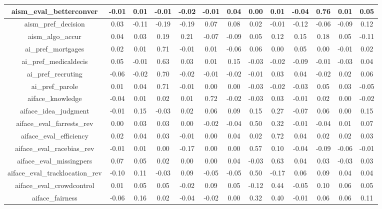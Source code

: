 {\begin{tabular}{c | c | c | c | c | c | c | c | c | c | c | c | c}
  \hline
  aism\_eval\_betterconver & -0.01 & 0.01 & -0.01 & -0.02 & -0.01 & 0.04 & 0.00 & 0.01 & -0.04 & 0.76 & 0.01 & 0.05 \\
  \hline
  aism\_pref\_decision & 0.03 & -0.11 & -0.19 & -0.19 & 0.07 & 0.08 & 0.02 & -0.01 & -0.12 & -0.06 & -0.09 & 0.12 \\
  \hline
  aism\_algo\_accur & 0.04 & 0.03 & 0.19 & 0.21 & -0.07 & -0.09 & 0.05 & 0.12 & 0.15 & 0.18 & 0.05 & -0.11 \\
  \hline
  ai\_pref\_mortgages & 0.02 & 0.01 & 0.71 & -0.01 & 0.01 & -0.06 & 0.06 & 0.00 & 0.05 & 0.00 & -0.01 & 0.02 \\
  \hline
  ai\_pref\_medicaldecis & 0.05 & -0.01 & 0.63 & 0.03 & 0.01 & 0.15 & -0.03 & -0.02 & -0.09 & -0.01 & -0.03 & 0.04 \\
  \hline
  ai\_pref\_recruting & -0.06 & -0.02 & 0.70 & -0.02 & -0.01 & -0.02 & -0.01 & 0.03 & 0.04 & -0.02 & 0.02 & 0.06 \\
  \hline
  ai\_pref\_parole & 0.01 & 0.04 & 0.71 & -0.01 & 0.00 & 0.00 & -0.03 & -0.02 & -0.03 & 0.05 & 0.03 & -0.05 \\
  \hline
  aiface\_knowledge & -0.04 & 0.01 & 0.02 & 0.01 & 0.72 & -0.02 & -0.03 & 0.03 & -0.01 & 0.02 & 0.00 & -0.02 \\
  \hline
  aiface\_idea\_judgment & -0.01 & 0.15 & -0.03 & 0.02 & 0.06 & 0.09 & 0.15 & 0.27 & -0.07 & 0.06 & 0.00 & 0.15 \\
  \hline
  aiface\_eval\_farrests\_rev & 0.00 & 0.03 & 0.03 & 0.00 & -0.02 & -0.04 & 0.50 & 0.32 & -0.01 & -0.04 & 0.01 & 0.07 \\
  \hline
  aiface\_eval\_efficiency & 0.02 & 0.04 & 0.03 & -0.01 & 0.00 & 0.04 & 0.02 & 0.72 & 0.04 & 0.02 & 0.02 & 0.03 \\
  \hline
  aiface\_eval\_racebias\_rev & -0.01 & 0.01 & 0.00 & -0.17 & 0.00 & 0.00 & 0.57 & 0.10 & -0.04 & -0.09 & -0.06 & -0.01 \\
  \hline
  aiface\_eval\_missingpers & 0.07 & 0.05 & 0.02 & 0.00 & 0.00 & 0.04 & -0.03 & 0.63 & 0.04 & 0.03 & -0.03 & 0.03 \\
  \hline
  aiface\_eval\_tracklocation\_rev & -0.10 & 0.11 & -0.03 & 0.09 & -0.05 & -0.05 & 0.50 & -0.17 & 0.06 & 0.09 & 0.04 & 0.04 \\
  \hline
  aiface\_eval\_crowdcontrol & 0.01 & 0.05 & 0.05 & -0.02 & 0.09 & 0.05 & -0.12 & 0.44 & -0.05 & 0.10 & 0.06 & 0.05 \\
  \hline
  aiface\_fairness & -0.06 & 0.16 & 0.02 & -0.04 & -0.02 & 0.00 & 0.32 & 0.40 & -0.01 & 0.06 & 0.06 & 0.11 \\

\end{tabular}}
